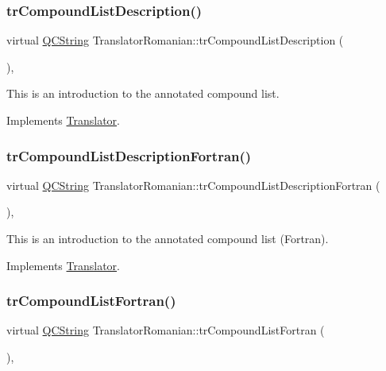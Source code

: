 \subsubsection{\texorpdfstring{trCompoundListDescription()}{trCompoundListDescription()}}
{\footnotesize\ttfamily virtual \mbox{\hyperlink{class_q_c_string}{Q\+C\+String}} Translator\+Romanian\+::tr\+Compound\+List\+Description (\begin{DoxyParamCaption}{ }\end{DoxyParamCaption})\hspace{0.3cm}{\ttfamily [inline]}, {\ttfamily [virtual]}}

This is an introduction to the annotated compound list. 

Implements \mbox{\hyperlink{class_translator}{Translator}}.

\mbox{\label{class_translator_romanian_a13d133d6c1836bfb723a301bcfd7db7b}} 
\subsubsection{\texorpdfstring{trCompoundListDescriptionFortran()}{trCompoundListDescriptionFortran()}}
{\footnotesize\ttfamily virtual \mbox{\hyperlink{class_q_c_string}{Q\+C\+String}} Translator\+Romanian\+::tr\+Compound\+List\+Description\+Fortran (\begin{DoxyParamCaption}{ }\end{DoxyParamCaption})\hspace{0.3cm}{\ttfamily [inline]}, {\ttfamily [virtual]}}

This is an introduction to the annotated compound list (Fortran). 

Implements \mbox{\hyperlink{class_translator}{Translator}}.

\mbox{\label{class_translator_romanian_a9fc4f0bd3e65891f91c9a4491d99987e}} 
\subsubsection{\texorpdfstring{trCompoundListFortran()}{trCompoundListFortran()}}
{\footnotesize\ttfamily virtual \mbox{\hyperlink{class_q_c_string}{Q\+C\+String}} Translator\+Romanian\+::tr\+Compound\+List\+Fortran (\begin{DoxyParamCaption}{ }\end{DoxyParamCaption})\hspace{0.3cm}{\ttfamily [inline]}, {\ttfamily [virtual]}}

